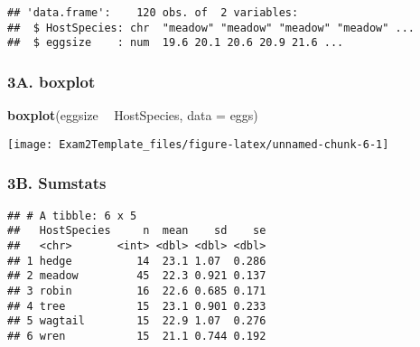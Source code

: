 \documentclass[]{article}
\newenvironment{Shaded}{\begin{snugshade}}{\end{snugshade}}
\newcommand{\DataTypeTok}[1]{\textcolor[rgb]{0.13,0.29,0.53}{#1}}
\newcommand{\KeywordTok}[1]{\textcolor[rgb]{0.13,0.29,0.53}{\textbf{#1}}}
\newcommand{\NormalTok}[1]{#1}
\newcommand{\OperatorTok}[1]{\textcolor[rgb]{0.81,0.36,0.00}{\textbf{#1}}}
\newcommand{\StringTok}[1]{\textcolor[rgb]{0.31,0.60,0.02}{#1}}
\begin{document}
\begin{verbatim}
## 'data.frame':    120 obs. of  2 variables:
##  $ HostSpecies: chr  "meadow" "meadow" "meadow" "meadow" ...
##  $ eggsize    : num  19.6 20.1 20.6 20.9 21.6 ...
\end{verbatim}

\hypertarget{a.-boxplot}{%
\subsubsection{3A. boxplot}\label{a.-boxplot}}

\begin{Shaded}
\begin{Highlighting}[]
\KeywordTok{boxplot}\NormalTok{(eggsize }\OperatorTok{~}\StringTok{ }\NormalTok{HostSpecies, }\DataTypeTok{data =}\NormalTok{ eggs)}
\end{Highlighting}
\end{Shaded}

\texttt{[image: Exam2Template\_files/figure-latex/unnamed-chunk-6-1]}

\hypertarget{b.-sumstats}{%
\subsubsection{3B. Sumstats}\label{b.-sumstats}}

\begin{Shaded}
\end{Shaded}

\begin{verbatim}
## # A tibble: 6 x 5
##   HostSpecies     n  mean    sd    se
##   <chr>       <int> <dbl> <dbl> <dbl>
## 1 hedge          14  23.1 1.07  0.286
## 2 meadow         45  22.3 0.921 0.137
## 3 robin          16  22.6 0.685 0.171
## 4 tree           15  23.1 0.901 0.233
## 5 wagtail        15  22.9 1.07  0.276
## 6 wren           15  21.1 0.744 0.192
\end{verbatim}
\end{document}
